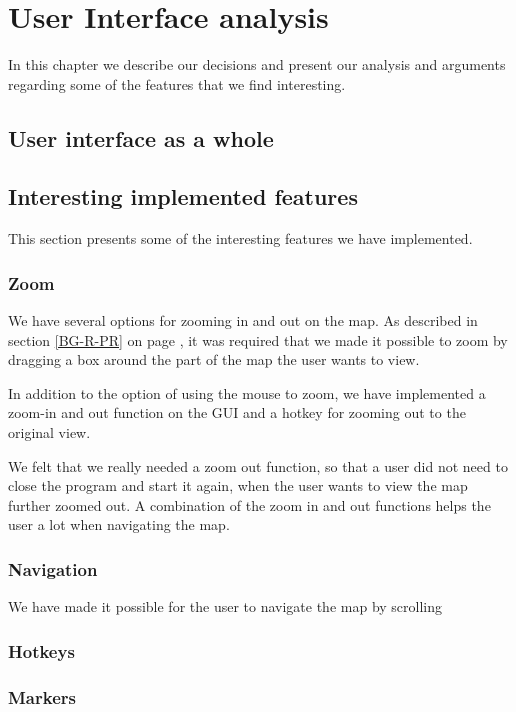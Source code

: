 \chapter{User Interface analysis}
\label{UIA}
In this chapter we describe our decisions and present our analysis and
arguments regarding some of the features that we find interesting.

\section{User interface as a whole}
\label{UIA-UIW}


\section{Interesting implemented features}
\label{UIA-IF}
This section presents some of the interesting features we have implemented.
\subsection{Zoom}
\label{UIA-IF-Z}
We have several options for zooming in and out on the map. As described in
section \ref{BG-R-PR} on page \pageref{BG-R-PR}, it was required that we made it
possible to zoom by dragging a box around the part of the map the user wants to
view.

In addition to the option of using the mouse to zoom, we have implemented a
zoom-in and out function on the GUI and a hotkey for zooming out to the original
view. 

We felt that we really needed a zoom out function, so that a user did not
need to close the program and start it again, when the user wants to view the
map further zoomed out. A combination of the zoom in and out functions helps the
user a lot when navigating the map.


\subsection{Navigation}
\label{UIA-IF-N}
We have made it possible for the user to navigate the map by scrolling 

\subsection{Hotkeys}
\label{UIA-IF-H}
\subsection{Markers}
\label{UIA-IF-M}

